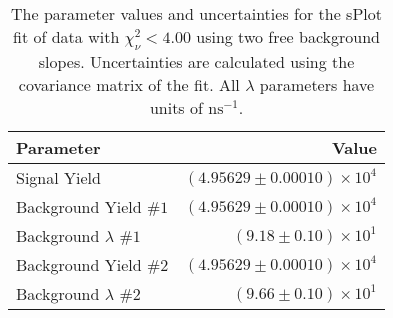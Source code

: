 
\begin{table}[ht]
    \begin{center}
        \begin{tabular}{lr}\toprule
            Parameter & Value \\\midrule
            Signal Yield & $(4.95629 \pm 0.00010) \times 10^{4}$ \\
            Background Yield $\#1$ & $(4.95629 \pm 0.00010) \times 10^{4}$ \\
            Background $\lambda$ $\#1$ & $(9.18 \pm 0.10) \times 10^{1}$ \\
            Background Yield $\#2$ & $(4.95629 \pm 0.00010) \times 10^{4}$ \\
            Background $\lambda$ $\#2$ & $(9.66 \pm 0.10) \times 10^{1}$ \\\bottomrule
        \end{tabular}
        \caption{The parameter values and uncertainties for the sPlot fit of data with $\chi^2_\nu < 4.00$ using two free background slopes. Uncertainties are calculated using the covariance matrix of the fit. All $\lambda$ parameters have units of $\si{\nano\second}^{-1}$.}\label{tab:splot-fit-results-chisqdof-4.00-free-2}
    \end{center}
\end{table}
